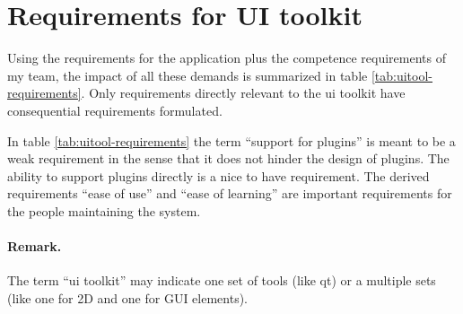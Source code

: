 \section{Requirements for UI toolkit}

Using the requirements for the application plus the competence requirements of
my team, the impact of all these demands is summarized in table
\ref{tab:uitool-requirements}. Only requirements directly relevant to the ui
toolkit have consequential requirements formulated.

In table \ref{tab:uitool-requirements} the term ``support for plugins'' is
meant to be a weak requirement in the sense that it does not hinder the design
of plugins. The ability to support plugins directly is a nice to have
requirement. The derived requirements ``ease of use'' and ``ease of learning''
are important requirements for the people maintaining the system.

\paragraph{Remark.} The term ``ui toolkit'' may indicate one set of tools (like qt) or
a multiple sets (like one for 2D and one for GUI elements).

